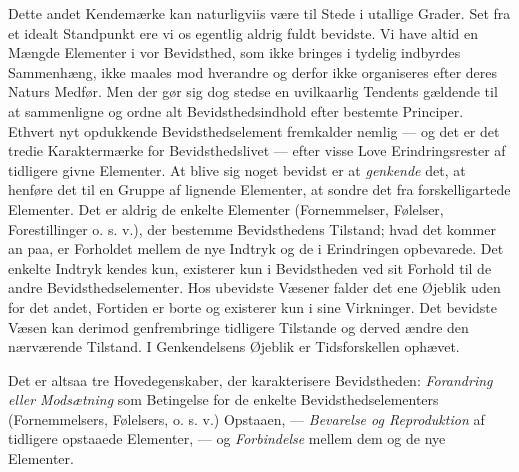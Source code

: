 \documentclass[12pt,a4paper,openany]{book}
\newcommand{\opage}[1]{\marginnote{\footnotesize\textit{[#1]}}}
\begin{document}
Dette andet Kendemærke kan naturligviis være til Stede i utallige
Grader. Set fra et idealt Standpunkt ere vi os egentlig aldrig fuldt
bevidste. Vi have altid en Mængde Elementer i vor Bevidsthed, som ikke
bringes i tydelig indbyrdes Sammenhæng, ikke maales mod hverandre og
derfor ikke organiseres efter deres Naturs Medfør. Men der gør sig dog
stedse en uvilkaarlig Tendents gældende til at sammenligne og ordne alt
Bevidsthedsindhold efter bestemte Principer. Ethvert
\opage{57}nyt opdukkende Bevidsthedselement fremkalder nemlig --- og det
er det tredie Karaktermærke for Bevidsthedslivet --- efter visse Love
Erindringsrester af tidligere givne Elementer. At blive sig noget
bevidst er at \emph{genkende} det, at henføre det til en Gruppe af
lignende Elementer, at sondre det fra forskelligartede Elementer. Det er
aldrig de enkelte Elementer (Fornemmelser, Følelser, Forestillinger o.
s. v.), der bestemme Bevidsthedens Tilstand; hvad det kommer an paa, er
Forholdet mellem de nye Indtryk og de i Erindringen opbevarede. Det
enkelte Indtryk kendes kun, existerer kun i Bevidstheden ved sit Forhold
til de andre Bevidsthedselementer. Hos ubevidste Væsener falder det ene
Øjeblik uden for det andet, Fortiden er borte og existerer kun i sine
Virkninger. Det bevidste Væsen kan derimod genfrembringe tidligere
Tilstande og derved ændre den nærværende Tilstand. I Genkendelsens
Øjeblik er Tidsforskellen ophævet.

Det er altsaa tre Hovedegenskaber, der karakterisere Bevidstheden:
\emph{Forandring eller Modsætning} som Betingelse for de enkelte
Bevidsthedselementers (Fornemmelsers, Følelsers, o. s. v.) Opstaaen, ---
\emph{Bevarelse og Reproduktion} af tidligere opstaaede Elementer, ---
og \emph{Forbindelse} mellem dem og de nye Elementer.
\end{document}
